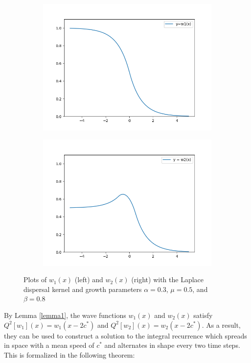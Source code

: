 \documentclass[11pt]{article}
\theoremstyle{definition}
\numberwithin{equation}{section}
\numberwithin{thm}{section}
\begin{document}
\begin{figure}
\centering
\begin{subfigure}{.5\textwidth}
  \centering
  \includegraphics[width=.8\linewidth]{figures/fig2A.png}
  \label{fig:sub1}
\end{subfigure}%
\begin{subfigure}{.5\textwidth}
  \centering
  \includegraphics[width=.8\linewidth]{figures/fig2B.png}
  \label{fig:sub2}
\end{subfigure}
\caption{Plots of $w_1(x)$ (left) and $w_2(x)$ (right) with the Laplace dispersal kernel and growth parameters $\alpha=0.3$, $\mu=0.5$, and $\beta=0.8$}
\label{fig:test}
\end{figure}

By Lemma \ref{lemma1}, the wave functions $w_1(x)$ and $w_2(x)$ satisfy $Q^2[w_1](x)=w_1(x-2c^*)$ and $Q^2[w_2](x)=w_2(x-2c^*)$. As a result, they can be used to construct a solution to the integral recurrence which spreads in space with a mean speed of $c^*$ and alternates in shape every two time steps. This is formalized in the following theorem:
\end{document}
